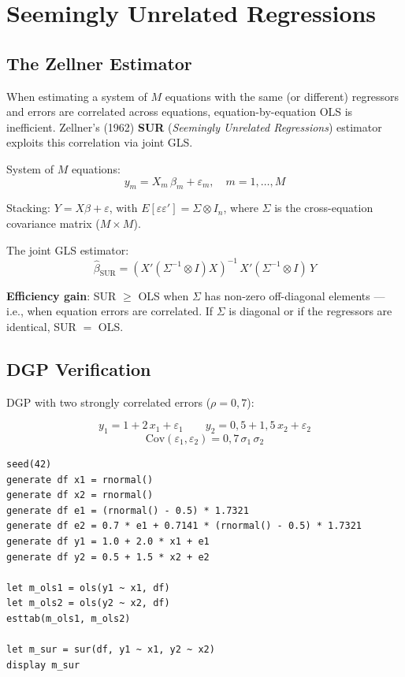 \chapter{Seemingly Unrelated Regressions}
\label{cap:sur}

\section{The Zellner Estimator}

When estimating a system of $M$ equations with the same (or different)
regressors and errors are correlated across equations, equation-by-equation
OLS is inefficient. Zellner's (1962) \textbf{SUR} (\emph{Seemingly Unrelated
Regressions}) estimator exploits this correlation via joint GLS.

System of $M$ equations:
\[
  y_m = X_m\,\beta_m + \varepsilon_m, \quad m = 1,\ldots,M
\]

Stacking: $Y = X\beta + \varepsilon$, with $E[\varepsilon\varepsilon'] = \Sigma \otimes I_n$,
where $\Sigma$ is the cross-equation covariance matrix ($M \times M$).

The joint GLS estimator:
\[
  \hat\beta_{\mathrm{SUR}} = (X'(\Sigma^{-1}\otimes I)X)^{-1}\,X'(\Sigma^{-1}\otimes I)\,Y
\]

\textbf{Efficiency gain}: SUR $\geq$ OLS when $\Sigma$ has non-zero off-diagonal
elements — i.e., when equation errors are correlated. If $\Sigma$ is diagonal
or if the regressors are identical, SUR $=$ OLS.

\section{DGP Verification}

DGP with two strongly correlated errors ($\rho = 0{,}7$):

\[
  y_1 = 1 + 2\,x_1 + \varepsilon_1 \qquad y_2 = 0{,}5 + 1{,}5\,x_2 + \varepsilon_2
\]
\[
  \mathrm{Cov}(\varepsilon_1, \varepsilon_2) = 0{,}7\,\sigma_1\,\sigma_2
\]

\begin{lstlisting}[caption={SUR DGP and comparison with equation-by-equation OLS}]
seed(42)
generate df x1 = rnormal()
generate df x2 = rnormal()
generate df e1 = (rnormal() - 0.5) * 1.7321
generate df e2 = 0.7 * e1 + 0.7141 * (rnormal() - 0.5) * 1.7321
generate df y1 = 1.0 + 2.0 * x1 + e1
generate df y2 = 0.5 + 1.5 * x2 + e2

let m_ols1 = ols(y1 ~ x1, df)
let m_ols2 = ols(y2 ~ x2, df)
esttab(m_ols1, m_ols2)

let m_sur = sur(df, y1 ~ x1, y2 ~ x2)
display m_sur
\end{lstlisting}

